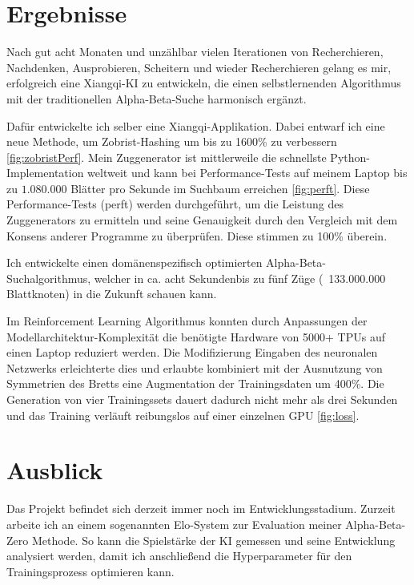 \documentclass{jpp}
\begin{document}
\section{Ergebnisse}
Nach gut acht Monaten und unzählbar vielen Iterationen von Recherchieren, Nachdenken, Ausprobieren, Scheitern und wieder Recherchieren gelang es mir, erfolgreich eine Xiangqi-KI zu entwickeln, die einen selbstlernenden Algorithmus mit der traditionellen Alpha-Beta-Suche harmonisch ergänzt. 

Dafür entwickelte ich selber eine Xiangqi-Applikation. Dabei entwarf ich eine neue Methode, um Zobrist-Hashing um bis zu 1600\% zu verbessern \ref{fig:zobristPerf}. Mein Zuggenerator ist mittlerweile die schnellste Python-Implementation weltweit und kann bei Performance-Tests auf meinem Laptop bis zu $1.080.000$ Blätter pro Sekunde im Suchbaum erreichen \ref{fig:perft}. Diese Performance-Tests (perft) werden durchgeführt, um die Leistung des Zuggenerators zu ermitteln und seine Genauigkeit durch den Vergleich mit dem Konsens anderer Programme zu überprüfen. Diese stimmen zu 100\% überein. 

Ich entwickelte einen domänenspezifisch optimierten Alpha-Beta-Suchalgorithmus, welcher in ca. acht Sekundenbis zu fünf Züge (~133.000.000 Blattknoten) in die Zukunft schauen kann.

Im Reinforcement Learning Algorithmus konnten durch Anpassungen der Modellarchitektur-Komplexität die benötigte Hardware von 5000+ TPUs auf einen Laptop reduziert werden. Die Modifizierung Eingaben des neuronalen Netzwerks erleichterte dies und erlaubte kombiniert mit der Ausnutzung von Symmetrien des Bretts eine Augmentation der Trainingsdaten um 400\%. Die Generation von vier Trainingssets dauert dadurch nicht mehr als drei Sekunden und das Training verläuft reibungslos auf einer einzelnen GPU \ref{fig:loss}.

\section{Ausblick}
Das Projekt befindet sich derzeit immer noch im Entwicklungsstadium. Zurzeit arbeite ich an einem sogenannten Elo-System zur Evaluation meiner Alpha-Beta-Zero Methode. So kann die Spielstärke der KI gemessen und seine Entwicklung analysiert werden, damit ich anschließend die Hyperparameter für den Trainingsprozess optimieren kann.
\end{document}

